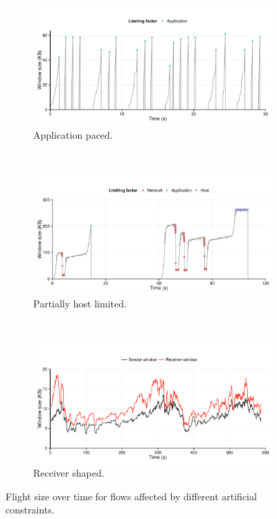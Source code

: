 \begin{figure}
\centering
  \centering
  \begin{subfigure}{1.0\linewidth}
    \includegraphics[width=1.0\textwidth]{figures/malawi/youtube.pdf}
    \caption{Application paced. \label{fig:youtube}}
  \end{subfigure}\\
  \begin{subfigure}{1.0\linewidth}
    \includegraphics[width=1.0\textwidth]{figures/malawi/hostflow.pdf}
    \caption{Partially host limited. \label{fig:hostlimited}}
  \end{subfigure}\\
  \begin{subfigure}{1.0\linewidth}
    \includegraphics[width=1.0\textwidth]{figures/malawi/awnd.pdf}
    \caption{Receiver shaped. \label{fig:awnd}}
  \end{subfigure}
  \caption{Flight size over time for flows affected by different artificial constraints. \label{fig:kindsOfFlowEffect}}
\end{figure}


